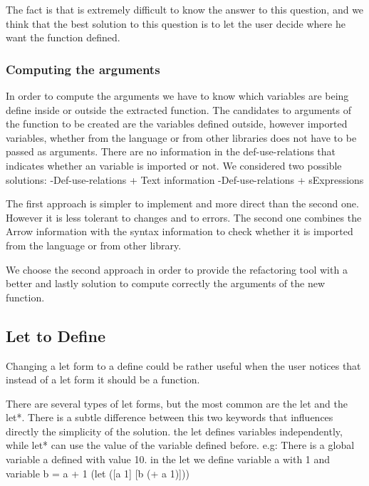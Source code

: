 The fact is that is extremely difficult to know the answer to this question, and
we think that the best solution to this question is to let the user decide where
he want the function defined.


\subsubsection{Computing the arguments}

In order to compute the arguments we have to know which variables are being define
inside or outside the extracted function.
The candidates to arguments of the function to be created are the variables defined
outside, however imported variables, whether from the language or from other libraries
does not have to be passed as arguments.
There are no information in the def-use-relations that indicates whether an variable
is imported or not.
We considered two possible solutions:
  -Def-use-relations + Text information
  -Def-use-relations + sExpressions

The first approach is simpler to implement and more direct than the second one.
However it is less tolerant to changes and to errors.
The second one combines the Arrow information with the syntax information to
check whether it is imported from the language or from other library.

We choose the second approach in order to provide the refactoring tool with a
better and lastly solution to compute correctly the arguments of the new function.

\subsection{Let to Define} %
Changing a let form to a define could be rather useful when the user
notices that instead of a let form it should be a function.

There are several types of let forms, but the most common are the let and the let*.
There is a subtle difference between this two keywords that influences directly the simplicity of the solution.
the let defines variables independently, while let* can use the value of the variable defined before.
e.g:
There is a global variable a defined with value 10.
in the let we define variable a with 1 and variable b = a + 1
(let ([a 1]
[b (+ a 1)]))

